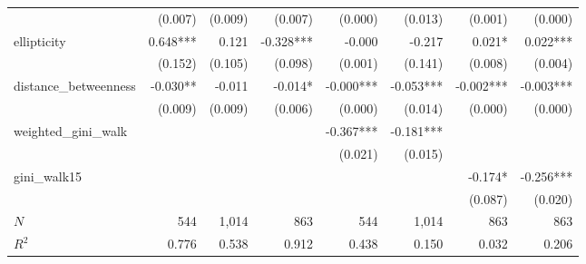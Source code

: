 \begin{tabular}{lrrrrrrr}
                      &                      (0.007) &                    (0.009) &                      (0.007) &                      (0.000) &                    (0.013) &                              (0.001) &                              (0.000) \\ 
ellipticity           &                     0.648*** &                      0.121 &                    -0.328*** &                       -0.000 &                     -0.217 &                               0.021* &                             0.022*** \\ 
                      &                      (0.152) &                    (0.105) &                      (0.098) &                      (0.001) &                    (0.141) &                              (0.008) &                              (0.004) \\ 
distance\_betweenness &                     -0.030** &                     -0.011 &                      -0.014* &                    -0.000*** &                  -0.053*** &                            -0.002*** &                            -0.003*** \\ 
                      &                      (0.009) &                    (0.009) &                      (0.006) &                      (0.000) &                    (0.014) &                              (0.000) &                              (0.000) \\ 
weighted\_gini\_walk  &                              &                            &                              &                    -0.367*** &                  -0.181*** &                                      &                                      \\ 
                      &                              &                            &                              &                      (0.021) &                    (0.015) &                                      &                                      \\ 
gini\_walk15          &                              &                            &                              &                              &                            &                              -0.174* &                            -0.256*** \\ 
                      &                              &                            &                              &                              &                            &                              (0.087) &                              (0.020) \\ 
\midrule
$N$                   &                          544 &                      1,014 &                          863 &                          544 &                      1,014 &                                  863 &                                  863 \\ 
$R^2$                 &                        0.776 &                      0.538 &                        0.912 &                        0.438 &                      0.150 &                                0.032 &                                0.206 \\ 
\bottomrule
\end{tabular}
